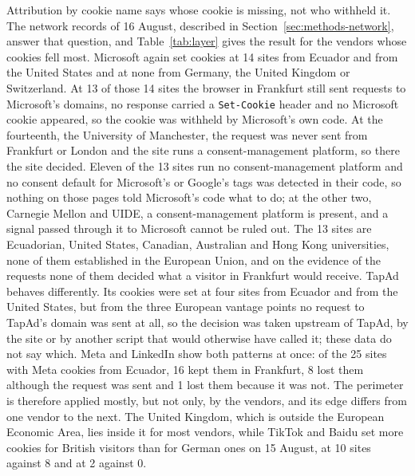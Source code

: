 \documentclass[]{interact}
\begin{document}
Attribution by cookie name says whose cookie is missing, not who withheld it. The network records of 16 August, described in Section~\ref{sec:methods-network}, answer that question, and Table~\ref{tab:layer} gives the result for the vendors whose cookies fell most. Microsoft again set cookies at 14 sites from Ecuador and from the United States and at none from Germany, the United Kingdom or Switzerland. At 13 of those 14 sites the browser in Frankfurt still sent requests to Microsoft's domains, no response carried a \verb|Set-Cookie| header and no Microsoft cookie appeared, so the cookie was withheld by Microsoft's own code. At the fourteenth, the University of Manchester, the request was never sent from Frankfurt or London and the site runs a consent-management platform, so there the site decided. Eleven of the 13 sites run no consent-management platform and no consent default for Microsoft's or Google's tags was detected in their code, so nothing on those pages told Microsoft's code what to do; at the other two, Carnegie Mellon and UIDE, a consent-management platform is present, and a signal passed through it to Microsoft cannot be ruled out. The 13 sites are Ecuadorian, United States, Canadian, Australian and Hong Kong universities, none of them established in the European Union, and on the evidence of the requests none of them decided what a visitor in Frankfurt would receive. TapAd behaves differently. Its cookies were set at four sites from Ecuador and from the United States, but from the three European vantage points no request to TapAd's domain was sent at all, so the decision was taken upstream of TapAd, by the site or by another script that would otherwise have called it; these data do not say which. Meta and LinkedIn show both patterns at once: of the 25 sites with Meta cookies from Ecuador, 16 kept them in Frankfurt, 8 lost them although the request was sent and 1 lost them because it was not. The perimeter is therefore applied mostly, but not only, by the vendors, and its edge differs from one vendor to the next. The United Kingdom, which is outside the European Economic Area, lies inside it for most vendors, while TikTok and Baidu set more cookies for British visitors than for German ones on 15 August, at 10 sites against 8 and at 2 against 0.
\end{document}

